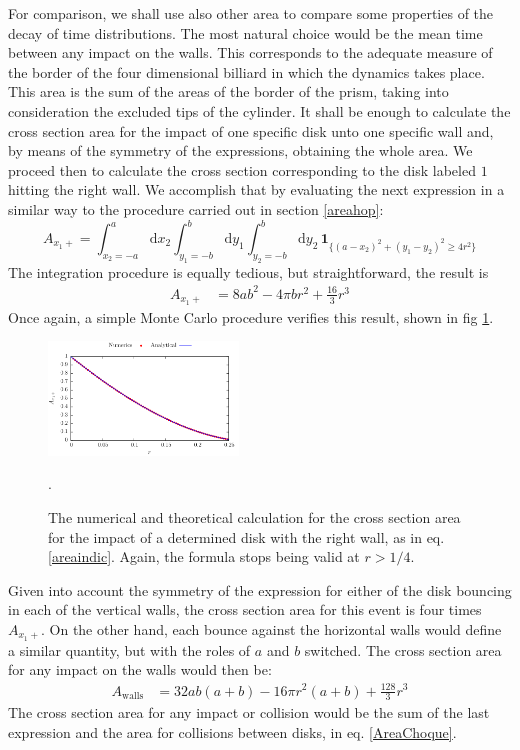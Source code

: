 \documentclass[letterpaper,10pt, jcp, aps]{revtex4-1}
\newcommand{\rd}{\!\mathrm{d}}
\newcommand{\indicator}[1]{\mathbf{1}_{ \{   #1 \} } }
\begin{document}
For comparison, we shall use also other area to compare
some properties of the decay of time distributions. The most natural choice
would be the mean time between any impact on the walls. This corresponds
to the adequate measure of the border of the four dimensional
billiard in which the dynamics takes place. This area is
the sum of the areas of the border of the
prism, taking into consideration the excluded tips of the cylinder. 
It shall be enough to calculate the cross section area for
the impact of one specific disk unto one specific wall and,
by means of the symmetry of the expressions, obtaining the whole
area. We proceed then to calculate the cross section corresponding to 
the disk labeled $1$ hitting the right wall. We accomplish that by
evaluating the next expression in a similar way to
the procedure carried out in section \ref{areahop}:
\begin{equation}\label{areaindic}
 A_{x_1+} =  \int_{x_2 = -a}^a \rd x_2 
\int_{y_1 = -b}^b \rd y_1 \int_{y_2 = -b}^b \rd y_2 \, \indicator{ (a-x_2)^2 + (y_1-y_2)^2 \ge 4 r^2 }
\end{equation}
The integration procedure is equally tedious, but
straightforward, the result is 
\begin{align}\label{areax1p}
 A_{x_1+} & = 8 a b^2-4  \pi b r^2 +\frac{16}{3}r^3 
\end{align}
Once again, a simple Monte Carlo procedure verifies this result,
shown in fig \ref{area1derecha}. 

\begin{figure}
\centering
\includegraphics[width=0.45\textwidth]{./FigurasPerfectas/AreaParedx1Positiva02.pdf}
\caption{The numerical and theoretical calculation for the cross section area
for the impact of a determined disk with the right wall, as in eq. \ref{areaindic}.
Again, the formula stops being valid at $r>1/4$. }
\label{area1derecha}.
\end{figure}

Given into account the symmetry of the expression for either of 
the disk bouncing in each of the vertical walls, the
cross section area for this event is four times $A_{x_1+}$. On
the other hand, each bounce against the horizontal walls would
define a similar quantity, but with the roles of $a$ and $b$ switched.
The cross section area for any impact on the walls would then be:
\begin{align}\label{areawalls}
 A_\text{walls} & = 32 a b (a+b)-16 \pi r^2 (a+b) +\frac{128}{3}r^3 
\end{align}
The cross section area for any impact or collision 
would be  the sum of the last expression
and the area for collisions between disks, in eq. \ref{AreaChoque}.
\end{document}
